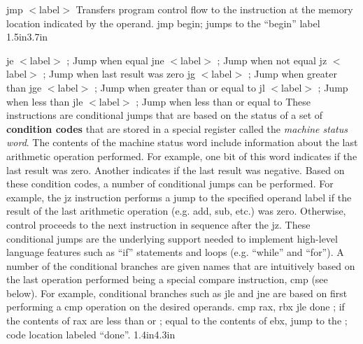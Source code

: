 {jmp $<$label$>$}
{Transfers program control flow to the instruction at the memory
  location indicated by the operand.}
{jmp begin}{; jumps to the ``begin'' label}
{1.5in}{3.7in}

{je $<$label$>$ ; Jump when equal\newline
jne $<$label$>$ ; Jump when not equal\newline
jz $<$label$>$ ; Jump when last result was zero\newline
jg $<$label$>$ ; Jump when greater than\newline
jge $<$label$>$ ; Jump when greater than or equal to\newline
jl $<$label$>$ ; Jump when less than\newline
jle $<$label$>$ ; Jump when less than or equal to}
{These instructions are conditional jumps that are based on the status
  of a set of {\bf condition codes} that are stored in a special
  register called the {\em machine status word}. The contents of the
  machine status word include information about the last arithmetic
  operation performed. For example, one bit of this word indicates if
  the last result was zero. Another indicates if the last result was
  negative.  Based on these condition codes, a number of conditional
  jumps can be performed. For example, the jz instruction performs a
  jump to the specified operand label if the result of the last
  arithmetic operation (e.g. add, sub, etc.) was zero. Otherwise,
  control proceeds to the next instruction in sequence after the jz.
  These conditional jumps are the underlying support needed to
  implement high-level language features such as ``if'' statements and
  loops (e.g. ``while'' and ``for''). \vspace{6pt}\newline
  A number of the conditional branches are given names that are
  intuitively based on the last operation performed being a special
  compare instruction, cmp (see below).  For example, conditional
  branches such as jle and jne are based on first performing a cmp
  operation on the desired operands.}
{cmp rax, rbx \newline jle done}
{; if the contents of rax are less than or \newline
; equal to the contents of ebx, jump to the \newline
; code location labeled ``done''.}
{1.4in}{4.3in}

